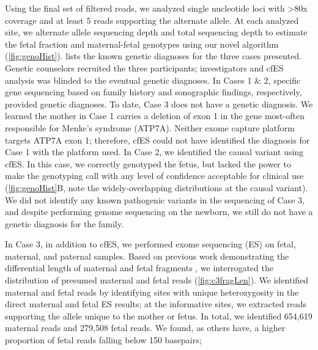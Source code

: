 \documentclass{article}\usepackage[]{graphicx}\usepackage[]{color}
\begin{document}
Using the final set of filtered reads, we analyzed single nucleotide loci with >80x coverage and at least 5 reads supporting the alternate allele.
At each analyzed site, we alternate allele sequencing depth and total sequencing depth to estimate the fetal fraction and maternal-fetal genotypes using our novel algorithm (\cref{fig:genoHist}).
 lists the known genetic diagnoses for the three cases presented.
Genetic counselors recruited the three participants; investigators and cfES analysis was blinded to the eventual genetic diagnoses.
In Cases 1 \& 2, specific gene sequencing based on family history and sonographic findings, respectively, provided genetic diagnoses.
To date, Case 3 does not have a genetic diagnosis.
We learned the mother in Case 1 carries a deletion of exon 1 in the gene most-often responsible for Menke’s syndrome (ATP7A).
Neither exome capture platform targets ATP7A exon 1; therefore, cfES could not have identified the diagnosis for Case 1 with the platform used.
In Case 2, we identified the causal variant using cfES.
In this case, we correctly genotyped the fetus, but lacked the power to make the genotyping call with any level of confidence acceptable for clinical use (\cref{fig:genoHist}B, note the widely-overlapping distributions at the causal variant).
We did not identify any known pathogenic variants in the sequencing of Case 3, and despite performing genome sequencing on the newborn, we still do not have a genetic diagnosis for the family.

In Case 3, in addition to cfES, we performed exome sequencing (ES) on fetal, maternal, and paternal samples.
Based on previous work demonstrating the differential length of maternal and fetal fragments \cite{chan:2004aa,chan:2016aa,jiang:2016ab,rabinowitz:2019aa}, we interrogated the distribution of presumed maternal and fetal reads (\cref{fig:c3fragLen}).
We identified maternal and fetal reads by identifying sites with unique heterozygosity in the direct maternal and fetal ES results; at the informative sites, we extracted reads supporting the allele unique to the mother or fetus.
In total, we identified 654,619 maternal reads and 279,508 fetal reads.
We found, as others have, a higher proportion of fetal reads falling below 150 basepairs; 
\end{document}
